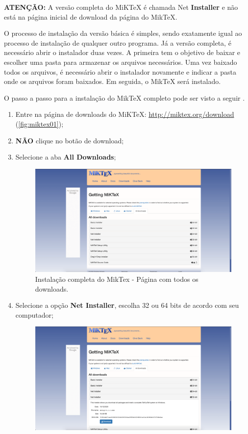 \textbf{ATENÇÃO:} A versão completa do MiKTeX é chamada Net \textbf{Installer} e não está na página inicial de download da página do MikTeX.

O processo de instalação da versão básica é simples, sendo exatamente igual ao processo de instalação de qualquer outro programa. Já a versão completa, é necessário abrir o instalador duas vezes. A primeira tem o objetivo de baixar e escolher uma pasta para armazenar os arquivos necessários. Uma vez baixado todos os arquivos, é necessário abrir o instalador novamente e indicar a pasta onde os arquivos foram baixados. Em seguida, o MikTeX será instalado.
 
O passo a passo para a instalação do MikTeX completo pode ser visto a seguir \cite{miktexfull}.

\begin{enumerate}
\item Entre na página de downloads do MiKTeX: \url{http://miktex.org/download} (\autoref{fig:miktex01});
\item \textbf{NÃO} clique no botão de download;
\item Selecione a aba \textbf{All Downloads};
\begin{figure}[H]
  \centering
  \includegraphics[width=1.0\textwidth]{./fig/miktex09}
  \caption{Instalação completa do MikTex - Página com todos os downloads.}
\end{figure}
\item Selecione a opção \textbf{Net Installer}, escolha 32 ou 64 bits de acordo com seu computador;
\begin{figure}[H]
  \centering
  \includegraphics[width=1.0\textwidth]{./fig/miktex10}

\end{figure}
\end{enumerate}
